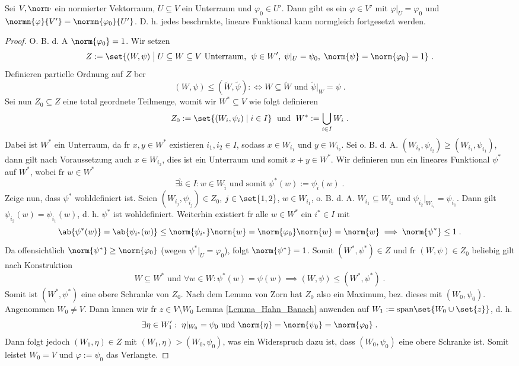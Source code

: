 \begin{theorem}
	Sei \(V,\norm\cdot\) ein normierter Vektorraum, \(U\subseteq V\) ein Unterraum und \(\varphi_0 \in U'\). Dann gibt es ein \(\varphi \in V'\) mit \(\varphi\vert_U = \varphi_0\) und \(\normn{\varphi}{V'} = \normn{\varphi_0}{U'}\). D. h. jedes beschr\as nkte, lineare Funktional kann normgleich fortgesetzt werden. 
\end{theorem}
\begin{proof}
	O. B. d. A \(\norm{\varphi_0} = 1\). Wir setzen
	\[Z := \set{(W,\psi)\;\big\vert\; U\subseteq W \subseteq V \text{ Unterraum, }\;\psi \in W',\; \psi\vert_U = \psi_0,\; \norm{\psi} = \norm{\varphi_0} = 1}\;.\]
	Definieren partielle Ordnung auf $Z$ \us ber
	\[(W,\psi) \leq (\tilde W, \tilde \psi) : \iff W \subseteq \tilde W \text{ und } \tilde\psi \vert_W = \psi\;.\]
	Sei nun $Z_0\subseteq Z$ eine total geordnete Teilmenge, womit wir $W^*\subseteq V$ wie folgt definieren
	\[Z_0 := \set{(W_i,\psi_i)\;\vert\; i \in I}\;\text{ und }\; W^* := \bigcup_{i\in I} W_i\;.\]
	Dabei ist $W^*$ ein Unterraum, da f\us r \(x,y \in W^*\) existieren \(i_1, i_2 \in I\), sodass \(x \in W_{i_1}\) und \(y\in W_{i_2}\). Sei o. B. d. A. \((W_{i_2}, \psi_{i_2}) \geq (W_{i_1}, \psi_{i_1})\), dann gilt nach Voraussetzung auch \(x\in W_{i_2}\), dies ist ein Unterraum und somit \(x+y \in W^*\). Wir definieren nun ein lineares Funktional \(\psi^*\) auf \(W^*\), wobei f\us r \(w \in W^*\)
	\[ \exists \hat i\in I: w \in W_{\hat i} \text{ und somit }\psi^*(w) := \psi_{\hat i}(w)\;.\]
	Zeige nun, dass \(\psi^*\) wohldefiniert ist. Seien \((W_{i_j}, \psi_{i_j})\in Z_0\), \(j\in\set{1,2}\), \(w\in W_{i_1}\), o. B. d. A. \(W_{i_1}\subseteq W_{i_2}\) und \(\psi_{i_2}\vert_{W_{i_1}} = \psi_{i_1}\). Dann gilt \(\psi_{i_2}(w) = \psi_{i_1}(w)\), d. h. 
	\(\psi^*\) ist wohldefiniert. Weiterhin existiert f\us r alle \(w\in W^*\) ein \(i^* \in I \) mit 
	\[\ab{\psi^*(w)} = \ab{\psi_{i^*}(w)} \leq \norm{\psi_{i^*}}\norm{w} = \norm{\varphi_0} \norm{w} = \norm{w} \implies \norm{\psi^*} \leq 1\;.\]
	Da offensichtlich \(\norm{\psi^*} \geq \norm{\varphi_0}\) (wegen \(\psi^*\vert_U = \varphi_0\)), folgt \(\norm{\psi^*} = 1\).
	Somit \((W^*, \psi^*)\in Z\) und f\us r \((W,\psi) \in Z_0\) beliebig gilt nach Konstruktion 
	\[W \subseteq W^* \text{ und } \forall w \in W: \psi^*(w) = \psi(w) \implies (W,\psi) \leq (W^*, \psi^*)\;.\]
	Somit ist \((W^*, \psi^*)\) eine obere Schranke von $Z_0$. Nach dem Lemma von Zorn hat $Z_0$ also ein Maximum, bez. dieses mit \((W_0,\psi_0)\). Angenommen \(W_0 \neq V\). Dann k\os nnen wir f\us r \(z \in V \setminus W_0\) Lemma \ref{Lemma_Hahn_Banach} anwenden auf \(W_1:= \text{span}\set{W_0\cup\set{z}}\), d. h.
	\[\exists \eta \in W_1' :\; \eta\vert_{W_0} = \psi_0 \text{ und } \norm{\eta} = \norm{\psi_0} = \norm{\varphi_0}\;.\]
	Dann folgt jedoch \((W_1,\eta) \in Z\) mit \((W_1,\eta) > (W_0,\psi_0)\), was ein Widerspruch dazu ist, dass \((W_0, \psi_0)\) eine obere Schranke ist. Somit leistet \(W_0 = V\) und \(\varphi:= \psi_0\) das Verlangte.
\end{proof}
	
